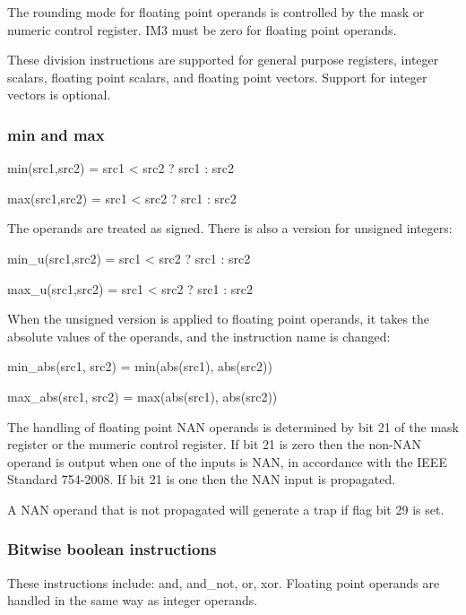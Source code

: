 \documentclass[forwardcom.tex]{subfiles}
\begin{document}
\vspace{2mm}
The rounding mode for floating point operands is controlled by the mask or numeric control register. IM3 must be zero for floating point operands.

\vspace{2mm}
These division instructions are supported for general purpose registers, integer scalars,
floating point scalars, and floating point vectors. Support for integer vectors is optional.


\subsubsection{min and max}
min(src1,src2) = src1 \textless{} src2 ? src1 : src2

max(src1,src2) = src1 \textless{} src2 ? src1 : src2
\vspace{2mm}

The operands are treated as signed. There is also a version for unsigned integers:
\vspace{2mm}

min\_u(src1,src2) = src1 \textless{} src2 ? src1 : src2

max\_u(src1,src2) = src1 \textless{} src2 ? src1 : src2
\vspace{2mm}

When the unsigned version is applied to floating point operands, it takes the absolute values of the operands, and the instruction name is changed:
\vspace{2mm}

min\_abs(src1, src2) = min(abs(src1), abs(src2))

max\_abs(src1, src2) = max(abs(src1), abs(src2))
\vspace{2mm}

The handling of floating point NAN operands is determined by bit 21 of the mask register or the mumeric control register. If bit 21 is zero then the non-NAN operand is output when one of the inputs is NAN, in accordance with the IEEE Standard 754-2008. If bit 21 is one then the NAN input is propagated.
\vspace{2mm}

A NAN operand that is not propagated will generate a trap if flag bit 29 is set.

\subsubsection{Bitwise boolean instructions}
These instructions include: and, and\_not, or, xor. Floating point operands are handled in the same way as integer operands.
\end{document}
